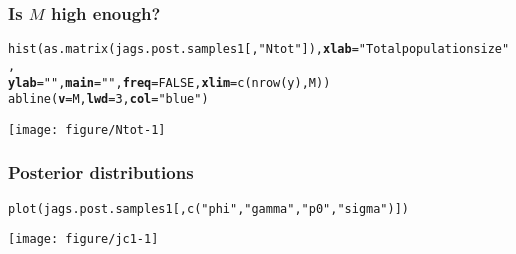 \documentclass[color=usenames,dvipsnames]{beamer}\usepackage[]{graphicx}\usepackage[]{color}
\makeatletter
\newcommand{\hlnum}[1]{\textcolor[rgb]{0.69,0.494,0}{#1}}%
\newcommand{\hlstr}[1]{\textcolor[rgb]{0.749,0.012,0.012}{#1}}%
\newcommand{\hlstd}[1]{\textcolor[rgb]{0,0,0}{#1}}%
\newcommand{\hlkwc}[1]{\textcolor[rgb]{0,0,0}{\textbf{#1}}}%
\newcommand{\hlkwd}[1]{\textcolor[rgb]{0.004,0.004,0.506}{#1}}%
\newenvironment{kframe}{%
 \def\at@end@of@kframe{}%
 \ifinner\ifhmode%
  \def\at@end@of@kframe{\end{minipage}}%
  \begin{minipage}{\columnwidth}%
 \fi\fi%
 \def\FrameCommand##1{\hskip\@totalleftmargin \hskip-\fboxsep
 \colorbox{shadecolor}{##1}\hskip-\fboxsep
     \hskip-\linewidth \hskip-\@totalleftmargin \hskip\columnwidth}%
 \MakeFramed {\advance\hsize-\width
   \@totalleftmargin\z@ \linewidth\hsize
   \@setminipage}}%
 {\par\unskip\endMakeFramed%
 \at@end@of@kframe}
\newenvironment{knitrout}{}{} %
\makeatother
\begin{document}
\begin{frame}[fragile]
  \frametitle{Is $M$ high enough?}
\begin{knitrout}\tiny
{}\color{fgcolor}\begin{kframe}
\begin{alltt}
\hlkwd{hist}\hlstd{(}\hlkwd{as.matrix}\hlstd{(jags.post.samples1[,}\hlstr{"Ntot"}\hlstd{]),} \hlkwc{xlab}\hlstd{=}\hlstr{"Total population size"}\hlstd{,}
     \hlkwc{ylab}\hlstd{=}\hlstr{""}\hlstd{,} \hlkwc{main}\hlstd{=}\hlstr{""}\hlstd{,} \hlkwc{freq}\hlstd{=}\hlnum{FALSE}\hlstd{,} \hlkwc{xlim}\hlstd{=}\hlkwd{c}\hlstd{(}\hlkwd{nrow}\hlstd{(y), M))}
\hlkwd{abline}\hlstd{(}\hlkwc{v}\hlstd{=M,} \hlkwc{lwd}\hlstd{=}\hlnum{3}\hlstd{,} \hlkwc{col}\hlstd{=}\hlstr{"blue"}\hlstd{)}
\end{alltt}
\end{kframe}

{\centering \texttt{[image: figure/Ntot-1]} 

}



\end{knitrout}
\end{frame}






\begin{frame}[fragile]
  \frametitle{Posterior distributions}
\begin{knitrout}\scriptsize
{}\color{fgcolor}\begin{kframe}
\begin{alltt}
\hlkwd{plot}\hlstd{(jags.post.samples1[,}\hlkwd{c}\hlstd{(}\hlstr{"phi"}\hlstd{,} \hlstr{"gamma"}\hlstd{,} \hlstr{"p0"}\hlstd{,} \hlstr{"sigma"}\hlstd{)])}
\end{alltt}
\end{kframe}

{\centering \texttt{[image: figure/jc1-1]} 

}



\end{knitrout}
\end{frame}
\end{document}

